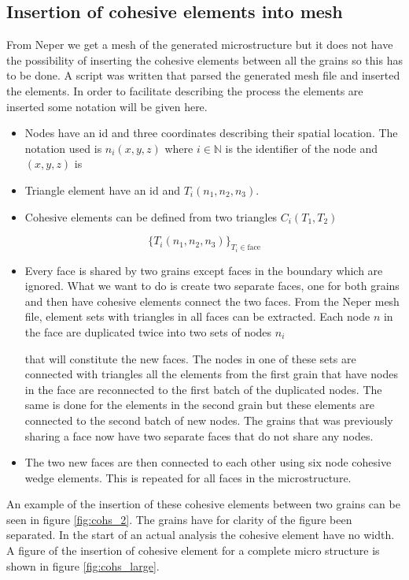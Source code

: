 \documentclass[grain_boundary_law.tex]{subfiles}
\begin{document}
\subsection{Insertion of cohesive elements into mesh}


From Neper we get a mesh of the generated microstructure but it does not have the possibility of inserting the cohesive elements between all the grains so this has to be done. A script was written that parsed the generated mesh file and inserted the elements. In order to facilitate describing the process the elements are inserted some notation will be given here.

\begin{itemize}
\item Nodes have an id and three coordinates describing their spatial location. The notation used is $n_i(x,y,z)$ where $i \in \mathbb{N}$ is the identifier of the node and $(x,y,z)$ is
\item Triangle element have an id and $T_i(n_1, n_2, n_3)$.
\item Cohesive elements can be defined from two triangles $C_i(T_1, T_2)$
\end{itemize}


\[ \{ T_i(n_1, n_2, n_3) \}_{T_i \in \text{face}} \]

%
\begin{itemize}
\item Every face is shared by two grains except faces in the boundary which are ignored. What we want to do is create two separate faces, one for both grains and then have cohesive elements connect the two faces. From the Neper mesh file, element sets with triangles in all faces can be extracted. Each node $n$ in the face are duplicated twice into two sets of nodes ${n_i}$

 that will constitute the new faces. The nodes in one of these sets are connected with triangles  all the elements from the first grain that have nodes in the face are reconnected to the first batch of the duplicated nodes.  The same is done for the elements in the second grain but these elements are connected to the second batch of new nodes. The grains that was previously sharing a face now have two separate faces that do not share any nodes.
\item The two new faces are then connected to each other using six node cohesive wedge elements. This is repeated for all faces in the microstructure. 
\end{itemize}
%
An example of the insertion of these cohesive elements between two grains can be seen in figure \ref{fig:cohs_2}. The grains have for clarity of the figure been separated. In the start of an actual analysis the cohesive element have no width. A figure of the insertion of cohesive element for a complete micro structure is shown in figure \ref{fig:cohs_large}.
\end{document}
